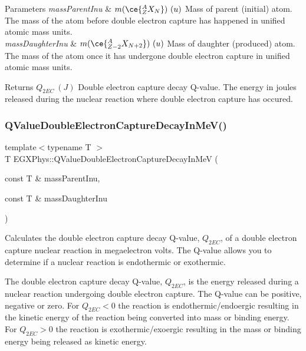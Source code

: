\begin{DoxyParams}{Parameters}
{\em mass\+Parent\+Inu} & $m(\ce{ ^{A}_{Z}X_{N} })\ (u)$ Mass of parent (initial) atom. The mass of the atom before double electron capture has happened in unified atomic mass units. \\
\hline
{\em mass\+Daughter\+Inu} & $m(\ce{ ^{A}_{Z-2}X_{N{+2}} })\ (u)$ Mass of daughter (produced) atom. The mass of the atom once it has undergone double electron capture in unified atomic mass units. \\
\hline
\end{DoxyParams}
\begin{DoxyReturn}{Returns}
$Q_{2EC}\ (J)$ Double electron capture decay Q-\/value. The energy in joules released during the nuclear reaction where double electron capture has occured. 
\end{DoxyReturn}
\mbox{\label{group___e_g_x_phys-_q_value_ga93e5774784c0d9551e46ba19e1dbc9ab}} 
\subsubsection{\texorpdfstring{Q\+Value\+Double\+Electron\+Capture\+Decay\+In\+Me\+V()}{QValueDoubleElectronCaptureDecayInMeV()}}
{\footnotesize\ttfamily template$<$typename T $>$ \\
T E\+G\+X\+Phys\+::\+Q\+Value\+Double\+Electron\+Capture\+Decay\+In\+MeV (\begin{DoxyParamCaption}\item[{const T \&}]{mass\+Parent\+Inu,  }\item[{const T \&}]{mass\+Daughter\+Inu }\end{DoxyParamCaption})}



Calculates the double electron capture decay Q-\/value, $Q_{2EC}$, of a double electron capture nuclear reaction in megaelectron volts. The Q-\/value allows you to determine if a nuclear reaction is endothermic or exothermic. 

The double electron capture decay Q-\/value, $Q_{2EC}$, is the energy released during a nuclear reaction undergoing double electron capture. The Q-\/value can be positive, negative or zero. For $Q_{2EC} < 0$ the reaction is endothermic/endoergic resulting in the kinetic energy of the reaction being converted into mass or binding energy. For $Q_{2EC} > 0$ the reaction is exothermic/exoergic resulting in the mass or binding energy being released as kinetic energy.

